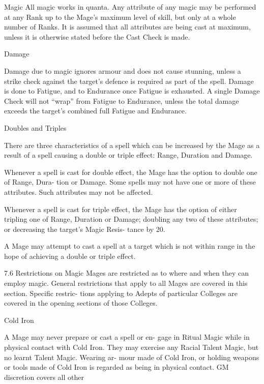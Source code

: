 \begin{Chapter}{Magic}
All  magic  works  in  quanta.  Any  attribute  of  any 
magic  may  be  performed  at  any  Rank  up  to  the 
Mage’s  maximum  level  of  skill,  but  only  at  a 
whole  number  of  Ranks.  It  is  assumed  that  all 
attributes  are  being  cast  at  maximum,  unless  it  is 
otherwise stated before the Cast Check is made. 

Damage 

Damage due to magic ignores armour and does not 
cause  stunning,  unless  a  strike  check  against  the 
target’s  defence  is  required  as  part  of  the  spell. 
Damage is done to Fatigue, and to Endurance once 
Fatigue is exhausted. A single Damage Check will 
not  “wrap”  from  Fatigue  to  Endurance,  unless  the 
total  damage  exceeds  the  target’s  combined  full 
Fatigue and Endurance. 

Doubles and Triples 

There are three characteristics of a spell which can 
be  increased  by  the  Mage  as  a  result  of  a  spell 
causing  a  double  or  triple  effect:  Range,  Duration 
and Damage. 

Whenever  a  spell  is  cast  for  double  effect,  the 
Mage has the option to double one of Range, Dura-
tion or Damage. Some spells may not have one or 
more of these attributes. Such attributes may not be 
affected. 

Whenever a spell is cast for triple effect, the Mage 
has  the  option  of  either  tripling  one  of  Range, 
Duration  or  Damage;  doubling  any  two  of  these 
attributes;  or  decreasing  the  target’s  Magic  Resis-
tance by 20. 

A  Mage  may  attempt  to  cast  a  spell  at  a  target 
which is not within range in the hope of achieving 
a double or triple effect. 

7.6 Restrictions on Magic 
Mages are restricted as to where and when they can 
employ magic. General restrictions that apply to all 
Mages are covered in this section. Specific restric-
tions applying to Adepts of particular Colleges are 
covered in the opening sections of those Colleges. 

Cold Iron 

A  Mage  may  never  prepare  or  cast  a  spell  or  en-
gage in Ritual Magic while in physical contact with 
Cold  Iron.  They  may  exercise  any  Racial  Talent 
Magic,  but  no  learnt  Talent  Magic.  Wearing  ar-
mour  made  of  Cold  Iron,  or  holding  weapons  or 
tools  made  of  Cold  Iron  is  regarded  as  being  in 
physical  contact.  GM  discretion  covers  all  other 


\end{Chapter}
